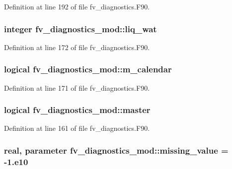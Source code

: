 Definition at line 192 of file fv\-\_\-diagnostics.\-F90.

\subsubsection[{liq\-\_\-wat}]{\setlength{\rightskip}{0pt plus 5cm}integer fv\-\_\-diagnostics\-\_\-mod\-::liq\-\_\-wat\hspace{0.3cm}{\ttfamily [private]}}\label{classfv__diagnostics__mod_a338a3f41be9414e9ec7ab618e5c451f7}


Definition at line 172 of file fv\-\_\-diagnostics.\-F90.

\subsubsection[{m\-\_\-calendar}]{\setlength{\rightskip}{0pt plus 5cm}logical fv\-\_\-diagnostics\-\_\-mod\-::m\-\_\-calendar\hspace{0.3cm}{\ttfamily [private]}}\label{classfv__diagnostics__mod_a960ab9b28f836a3d409385b29ca55c01}


Definition at line 171 of file fv\-\_\-diagnostics.\-F90.

\subsubsection[{master}]{\setlength{\rightskip}{0pt plus 5cm}logical fv\-\_\-diagnostics\-\_\-mod\-::master\hspace{0.3cm}{\ttfamily [private]}}\label{classfv__diagnostics__mod_a279b4f0374bf7714fae5b351ce11f023}


Definition at line 161 of file fv\-\_\-diagnostics.\-F90.

\subsubsection[{missing\-\_\-value}]{\setlength{\rightskip}{0pt plus 5cm}real, parameter fv\-\_\-diagnostics\-\_\-mod\-::missing\-\_\-value = -\/1.e10\hspace{0.3cm}{\ttfamily [private]}}\label{classfv__diagnostics__mod_a85945ffd2684b529ef36fb377f2780df}


